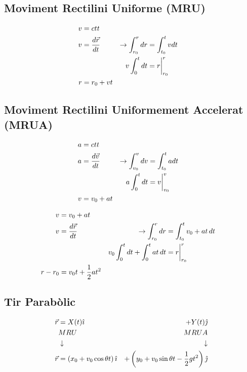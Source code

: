 \subsection{Moviment Rectilini Uniforme (MRU)}
\begin{align}\label{equ:Vel. MRU}
    v &= ctt \notag \\
    v &= \frac{d \vec{r}}{d t} &\rightarrow \int_{r_0}^r dr &= \int_{t_0}^t v  dt \notag \\
    && v \int_0^t dt &= r \bigg |_{r_0}^r \notag\\
    r &= r_0 + vt 
\end{align}

\subsection{Moviment Rectilini Uniformement Accelerat (MRUA)}
\begin{align}\label{equ:Vel. MRUA}
    a &= ctt \notag \\
    a &= \frac{d \vec{v}}{d t} &\rightarrow \int_{v_0}^v dv &= \int_{t_0}^t a  dt \notag \\
    && a \int_0^t dt &= v \bigg |_{v_0}^v \notag\\
    v &= v_0 + at 
\end{align}

\begin{align}\label{equ:Pos. MRUA}
    v &= v_0 + at  \notag \\
    v &= \frac{d \vec{r}}{d t} &\rightarrow \int_{r_0}^r dr &= \int_{t_0}^t v_0 + at \, dt \notag \\
    && v_0 \int_0^t dt + \int_0^t at\, dt &= r \bigg |_{r_0}^r \notag\\
    r - r_0 &= v_0t+\frac{1}{2}at^2 
\end{align}

\subsection{Tir Parabòlic}
\begin{align}\label{Tir Parabolic}
    \vec{r} &= X(t)\hat{\imath} & + Y(t)\hat{\jmath} \notag \\
    & MRU &  MRUA \notag \\
    & \downarrow  & \downarrow \notag \\
    \vec{r} &= \left(x_0+v_0\cos\theta t \right) \hat{\imath} & + \left( y_0 + v_0\sin\theta t - \frac{1}{2}gt^2\right) \hat{\jmath}
\end{align}

